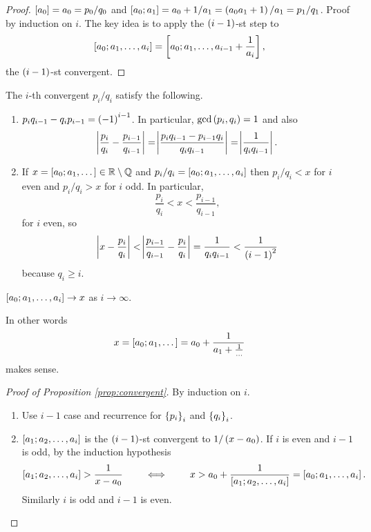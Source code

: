 \begin{proof}
$ \sbr{a_0} = a_0 = p_0 / q_0 $ and $ \sbr{a_0; a_1} = a_0 + 1 / a_1 = \br{a_0a_1 + 1} / a_1 = p_1 / q_1 $. Proof by induction on $ i $. The key idea is to apply the $ \br{i - 1} $-st step to
$$ \sbr{a_0; a_1, \dots, a_i} = \sbr{a_0; a_1, \dots, a_{i - 1} + \dfrac{1}{a_i}}, $$
the $ \br{i - 1} $-st convergent.
\end{proof}

\begin{proposition}
\label{prop:convergent}
The $ i $-th convergent $ p_i / q_i $ satisfy the following.
\begin{enumerate}
\item $ p_iq_{i - 1} - q_ip_{i - 1} = \br{-1}^{i - 1} $. In particular, $ \gcd\br{p_i, q_i} = 1 $ and also
$$ \abs{\dfrac{p_i}{q_i} - \dfrac{p_{i - 1}}{q_{i - 1}}} = \abs{\dfrac{p_iq_{i - 1} - p_{i - 1}q_i}{q_iq_{i - 1}}} = \abs{\dfrac{1}{q_iq_{i - 1}}}. $$
\item If $ x = \sbr{a_0; a_1, \dots} \in \RR \setminus \QQ $ and $ p_i / q_i = \sbr{a_0; a_1, \dots, a_i} $ then $ p_i / q_i < x $ for $ i $ even and $ p_i / q_i > x $ for $ i $ odd. In particular,
$$ \dfrac{p_i}{q_i} < x < \dfrac{p_{i - 1}}{q_{i - 1}}, $$
for $ i $ even, so
$$ \abs{x - \dfrac{p_i}{q_i}} < \abs{\dfrac{p_{i - 1}}{q_{i - 1}} - \dfrac{p_i}{q_i}} = \dfrac{1}{q_iq_{i - 1}} < \dfrac{1}{\br{i - 1}^2} $$
because $ q_i \ge i $.
\end{enumerate}
\end{proposition}

\pagebreak

\begin{corollary}
$ \sbr{a_0; a_1, \dots, a_i} \to x $ as $ i \to \infty $.
\end{corollary}

In other words
$$ x = \sbr{a_0; a_1, \dots} = a_0 + \dfrac{1}{a_1 + \tfrac{1}{\dots}} $$
makes sense.

\begin{proof}[Proof of Proposition \ref{prop:convergent}]
By induction on $ i $.
\begin{enumerate}
\item Use $ i - 1 $ case and recurrence for $ \cbr{p_i}_i $ and $ \cbr{q_i}_i $.
\item $ \sbr{a_1; a_2, \dots, a_i} $ is the $ \br{i - 1} $-st convergent to $ 1 / \br{x - a_0} $. If $ i $ is even and $ i - 1 $ is odd, by the induction hypothesis
$$ \sbr{a_1; a_2, \dots, a_i} > \dfrac{1}{x - a_0} \qquad \iff \qquad x > a_0 + \dfrac{1}{\sbr{a_1; a_2, \dots, a_i}} = \sbr{a_0; a_1, \dots, a_i}. $$
Similarly $ i $ is odd and $ i - 1 $ is even.
\end{enumerate}
\end{proof}

